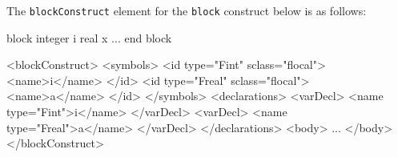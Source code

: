 The {\tt blockConstruct} element for the {\tt block} construct below is as follows:
\vspace{2mm}

\begin{Fexample2008}
block
 integer i
 real x
  ...
end block
\end{Fexample2008}
\vspace{1mm}

\begin{XcodeMLFExample}
<blockConstruct>
  <symbols>
     <id type="Fint" sclass="flocal">
       <name>i</name>
     </id>
     <id type="Freal" sclass="flocal">
       <name>a</name>
     </id>
   </symbols>
   <declarations>
     <varDecl>
       <name type="Fint">i</name>
     </varDecl>
     <varDecl>
       <name type="Freal">a</name>
     </varDecl>
  </declarations>
  <body>
     ...
  </body>
</blockConstruct>
\end{XcodeMLFExample}


